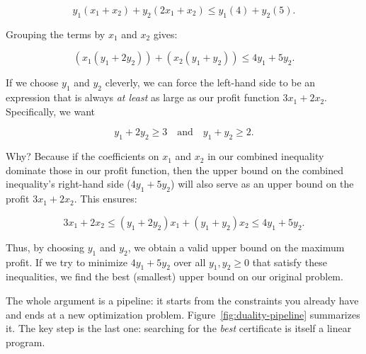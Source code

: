 \[
y_1(x_1 + x_2) + y_2(2x_1 + x_2) \leq y_1(4) + y_2(5).
\]

Grouping the terms by $x_1$ and $x_2$ gives:

\[
(x_1(y_1 + 2y_2)) + (x_2(y_1 + y_2)) \leq 4y_1 + 5y_2.
\]

If we choose $y_1$ and $y_2$ cleverly, we can force the left-hand side to be an expression that is always \emph{at least} as large as our profit function $3x_1 + 2x_2$. Specifically, we want

\[
y_1 + 2y_2 \geq 3 \quad \text{and} \quad y_1 + y_2 \geq 2.
\]

Why? Because if the coefficients on $x_1$ and $x_2$ in our combined inequality dominate those in our profit function, then the upper bound on the combined inequality's right-hand side ($4y_1 + 5y_2$) will also serve as an upper bound on the profit $3x_1 + 2x_2$. This ensures:

\[
3x_1 + 2x_2 \leq (y_1+2y_2)x_1 + (y_1 + y_2)x_2 \leq 4y_1 + 5y_2.
\]

Thus, by choosing $y_1$ and $y_2$, we obtain a valid upper bound on the maximum profit. If we try to minimize $4y_1 + 5y_2$ over all $y_1, y_2 \geq 0$ that satisfy these inequalities, we find the best (smallest) upper bound on our original problem.

The whole argument is a pipeline: it starts from the constraints you already have and ends at a new optimization problem.  Figure~\ref{fig:duality-pipeline} summarizes it.  The key step is the last one: searching for the \emph{best} certificate is itself a linear program.


